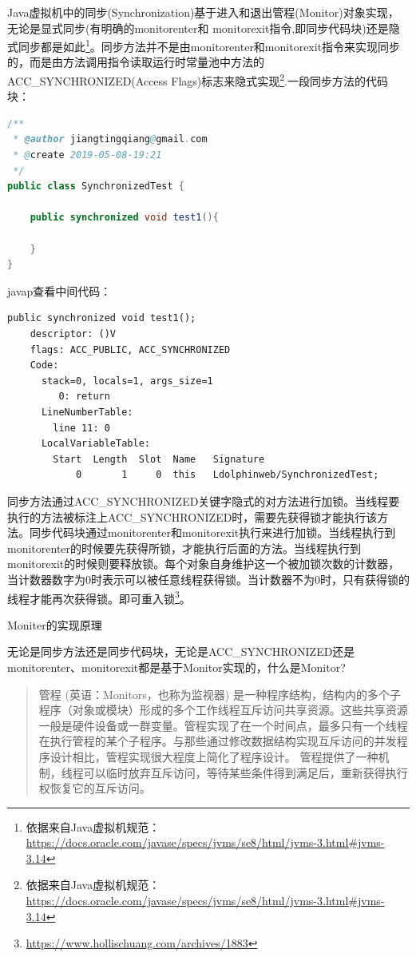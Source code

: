 \documentclass[8pt]{book}
\makeatletter
\numberwithin{dummy}{section}
\theoremstyle{ocrenumbox}
\theoremstyle{blacknumex}
\theoremstyle{blacknumbox}
\theoremstyle{ocrenum}
\renewcommand{\subsubsection}{\@startsection {subsubsection}{3}{\z@}
	{-2ex \@plus -0.1ex \@minus -.2ex}
	{.2ex \@plus.2ex }
	{\normalfont\small\sffamily\bfseries}}
\makeatother
\begin{document}
Java虚拟机中的同步(Synchronization)基于进入和退出管程(Monitor)对象实现，无论是显式同步(有明确的monitorenter和 monitorexit指令,即同步代码块)还是隐式同步都是如此\footnote{依据来自Java虚拟机规范：\url{https://docs.oracle.com/javase/specs/jvms/se8/html/jvms-3.html\#jvms-3.14}}。同步方法并不是由monitorenter和monitorexit指令来实现同步的，而是由方法调用指令读取运行时常量池中方法的ACC\_SYNCHRONIZED(Access Flags)标志来隐式实现\footnote{依据来自Java虚拟机规范：\url{https://docs.oracle.com/javase/specs/jvms/se8/html/jvms-3.html\#jvms-3.14}}.一段同步方法的代码块：

\begin{lstlisting}[language=Java]
/**
 * @author jiangtingqiang@gmail.com
 * @create 2019-05-08-19:21
 */
public class SynchronizedTest {

    public synchronized void test1(){

    }
}
\end{lstlisting}

javap查看中间代码：

\begin{lstlisting}
public synchronized void test1();
    descriptor: ()V
    flags: ACC_PUBLIC, ACC_SYNCHRONIZED
    Code:
      stack=0, locals=1, args_size=1
         0: return
      LineNumberTable:
        line 11: 0
      LocalVariableTable:
        Start  Length  Slot  Name   Signature
            0       1     0  this   Ldolphinweb/SynchronizedTest;
\end{lstlisting}

同步方法通过ACC\_SYNCHRONIZED关键字隐式的对方法进行加锁。当线程要执行的方法被标注上ACC\_SYNCHRONIZED时，需要先获得锁才能执行该方法。同步代码块通过monitorenter和monitorexit执行来进行加锁。当线程执行到monitorenter的时候要先获得所锁，才能执行后面的方法。当线程执行到monitorexit的时候则要释放锁。每个对象自身维护这一个被加锁次数的计数器，当计数器数字为0时表示可以被任意线程获得锁。当计数器不为0时，只有获得锁的线程才能再次获得锁。即可重入锁\footnote{\url{https://www.hollischuang.com/archives/1883}}。

\subsubsection{Moniter的实现原理}


无论是同步方法还是同步代码块，无论是ACC\_SYNCHRONIZED还是monitorenter、monitorexit都是基于Monitor实现的，什么是Monitor?

\begin{quotation}
管程 (英语：Monitors，也称为监视器) 是一种程序结构，结构内的多个子程序（对象或模块）形成的多个工作线程互斥访问共享资源。这些共享资源一般是硬件设备或一群变量。管程实现了在一个时间点，最多只有一个线程在执行管程的某个子程序。与那些通过修改数据结构实现互斥访问的并发程序设计相比，管程实现很大程度上简化了程序设计。 管程提供了一种机制，线程可以临时放弃互斥访问，等待某些条件得到满足后，重新获得执行权恢复它的互斥访问。
\end{quotation}
\end{document}
